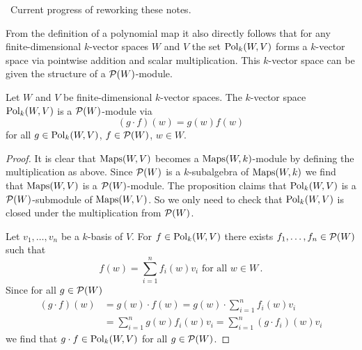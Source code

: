 \noindent\hrulefill \, Current progress of reworking these notes. \hrulefill


From the definition of a polynomial map it also directly follows that for any finite-dimensional $k$-vector spaces $W$ and $V$ the set $\operatorname{Pol}_k(W,V)$ forms a $k$-vector space via pointwise addition and scalar multiplication.
This $k$-vector space can be given the structure of a $\mathcal{P}(W)$-module.

\begin{proposition}
  Let $W$ and $V$ be finite-dimensional $k$-vector spaces.
  The $k$-vector space $\operatorname{Pol}_k(W,V)$ is a $\mathcal{P}(W)$-module via
  \[
      (g \cdot f)(w)
    = g(w) f(w)
  \]
  for all $g \in \operatorname{Pol}_k(W,V)$,
  $f \in \mathcal{P}(W)$,
  $w \in W$.
\end{proposition}
\begin{proof}
  It is clear that $\operatorname{Maps}(W,V)$ becomes a $\operatorname{Maps}(W,k)$-module by defining the multiplication as above.
  Since $\mathcal{P}(W)$ is a $k$-subalgebra of $\operatorname{Maps}(W,k)$ we find that $\operatorname{Maps}(W,V)$ is a $\mathcal{P}(W)$-module.
  The proposition claims that $\operatorname{Pol}_k(W,V)$ is a $\mathcal{P}(W)$-submodule of $\operatorname{Maps}(W,V)$.
  So we only need to check that $\operatorname{Pol}_k(W,V)$ is closed under the multiplication from $\mathcal{P}(W)$.
  
  Let $v_1, \dotsc, v_n$ be a $k$-basis of $V$.
  For $f \in \operatorname{Pol}_k(W,V)$ there exists $f_1, \dotsc, f_n \in \mathcal{P}(W)$ such that
  \[
      f(w)
    = \sum_{i=1}^n f_i(w) v_i
    \text{ for all }
    w \in W \,.
  \]
  Since for all $g \in \mathcal{P}(W)$
  \begin{align*}
        (g \cdot f)(w)
    &=  g(w) \cdot f(w)
     =  g(w) \cdot \sum_{i=1}^n f_i(w) v_i \\
    &=  \sum_{i=1}^n g(w) f_i(w) v_i
     =  \sum_{i=1}^n (g \cdot f_i)(w) v_i
  \end{align*}
  we find that $g \cdot f \in \operatorname{Pol}_k(W,V)$ for all $g \in \mathcal{P}(W)$.
\end{proof}



